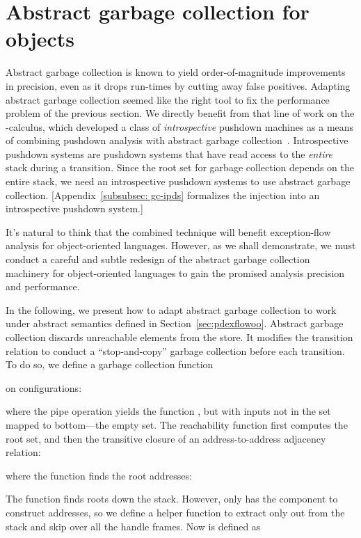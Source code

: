 \section{Abstract garbage collection for objects} \label{sec:agc-oo1}

Abstract garbage collection is known to yield order-of-magnitude improvements
in precision, even as it drops run-times by cutting away false positives.
Adapting abstract garbage collection seemed like the right tool to fix 
the performance problem of the previous section.
We directly benefit from that line of work on the -calculus, which 
developed a class of
\emph{introspective} pushdown machines as a means of combining
pushdown analysis with abstract garbage collection~\cite{Earl:2012:IPDCFA}.
Introspective pushdown systems are pushdown systems that have read access
to the \emph{entire} stack during a transition.
Since the root set for garbage collection depends on the entire stack,
we need an introspective pushdown systems to use abstract garbage collection.
[Appendix~\ref{subsubsec: gc-ipds} formalizes
the injection into an introspective pushdown system.]
  

It's natural to think that the combined technique will benefit 
exception-flow analysis for object-oriented languages.
However, as we shall demonstrate, 
    we must conduct a careful and subtle
    redesign of the abstract garbage collection machinery 
    for object-oriented languages
     to gain the promised analysis precision and performance.
    
  




 In the following, we present  how to adapt abstract garbage collection to work under 
abstract semantics defined in Section~\ref{sec:pdexflowoo}.
Abstract garbage collection discards unreachable elements from the
store.
It modifies the transition relation
to conduct a ``stop-and-copy'' garbage collection before each
transition.
To do so, we define a garbage collection function 

on
configurations:

  where the pipe operation  yields the function , but with
  inputs not in the set  mapped to bottom---the empty set.
The reachability function 
  first computes the root set, and then the transitive closure of an
  address-to-address adjacency relation: 

where the function  
  finds the root addresses:
  
  
 
  The  function
  finds roots down the stack. 
However,  only  has the component to construct addresses, so we define a 
helper function  
to extract only  out from the stack and skip over all the handle frames.
Now  is defined as
 
